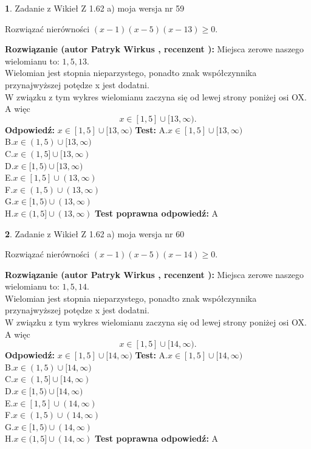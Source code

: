 \documentclass[12pt, a4paper]{article}
\theoremstyle{definition} %
\newtheorem{zad}{}
\newcommand{\zadStart}[1]{\begin{zad}#1\newline}
\newcommand{\zadStop}{\end{zad}}
\newcommand{\rozwStart}[2]{\noindent \textbf{Rozwiązanie (autor #1 , recenzent #2): }\newline}
\newcommand{\rozwStop}{\newline}
\newcommand{\odpStart}{\noindent \textbf{Odpowiedź:}\newline}
\newcommand{\odpStop}{\newline}
\newcommand{\testStart}{\noindent \textbf{Test:}\newline}
\newcommand{\testStop}{\newline}
\newcommand{\kluczStart}{\noindent \textbf{Test poprawna odpowiedź:}\newline}
\newcommand{\kluczStop}{\newline}
\begin{document}
\zadStart{Zadanie z Wikieł Z 1.62 a) moja wersja nr 59}

Rozwiązać nierówności $(x-1)(x-5)(x-13)\ge0$.
\zadStop
\rozwStart{Patryk Wirkus}{}
Miejsca zerowe naszego wielomianu to: $1, 5, 13$.\\
Wielomian jest stopnia nieparzystego, ponadto znak współczynnika przy\linebreak najwyższej potędze x jest dodatni.\\ W związku z tym wykres wielomianu zaczyna się od lewej strony poniżej osi OX. A więc $$x \in [1,5] \cup [13,\infty).$$
\rozwStop
\odpStart
$x \in [1,5] \cup [13,\infty)$
\odpStop
\testStart
A.$x \in [1,5] \cup [13,\infty)$\\
B.$x \in (1,5) \cup [13,\infty)$\\
C.$x \in (1,5] \cup [13,\infty)$\\
D.$x \in [1,5) \cup [13,\infty)$\\
E.$x \in [1,5] \cup (13,\infty)$\\
F.$x \in (1,5) \cup (13,\infty)$\\
G.$x \in [1,5) \cup (13,\infty)$\\
H.$x \in (1,5] \cup (13,\infty)$
\testStop
\kluczStart
A
\kluczStop



\zadStart{Zadanie z Wikieł Z 1.62 a) moja wersja nr 60}

Rozwiązać nierówności $(x-1)(x-5)(x-14)\ge0$.
\zadStop
\rozwStart{Patryk Wirkus}{}
Miejsca zerowe naszego wielomianu to: $1, 5, 14$.\\
Wielomian jest stopnia nieparzystego, ponadto znak współczynnika przy\linebreak najwyższej potędze x jest dodatni.\\ W związku z tym wykres wielomianu zaczyna się od lewej strony poniżej osi OX. A więc $$x \in [1,5] \cup [14,\infty).$$
\rozwStop
\odpStart
$x \in [1,5] \cup [14,\infty)$
\odpStop
\testStart
A.$x \in [1,5] \cup [14,\infty)$\\
B.$x \in (1,5) \cup [14,\infty)$\\
C.$x \in (1,5] \cup [14,\infty)$\\
D.$x \in [1,5) \cup [14,\infty)$\\
E.$x \in [1,5] \cup (14,\infty)$\\
F.$x \in (1,5) \cup (14,\infty)$\\
G.$x \in [1,5) \cup (14,\infty)$\\
H.$x \in (1,5] \cup (14,\infty)$
\testStop
\kluczStart
A
\kluczStop
\end{document}
